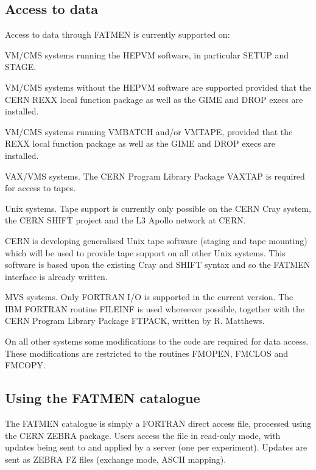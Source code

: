 \subsection{Access to data}
\par
Access to data through FATMEN is currently supported on:
\begin{OL}
\item
VM/CMS systems running the HEPVM software, in particular SETUP and STAGE.
\item
VM/CMS systems without the HEPVM software are supported
provided that the CERN REXX local function package as well as the
GIME and DROP execs are installed. 
\item 
{}
VM/CMS systems running VMBATCH and/or VMTAPE, provided that the
REXX local function package as well as the
GIME and DROP execs are installed. 
\item
{}
VAX/VMS systems. The CERN Program Library Package VAXTAP is required
for access to tapes.
\item
{}
Unix systems. Tape support is currently only possible on the CERN Cray
system, the CERN SHIFT project and the
L3 Apollo network at CERN.
\par
CERN is developing generalised Unix tape software (staging and tape
mounting) which will be used to provide tape support on all other
Unix systems. This software is based upon the existing Cray and
SHIFT syntax and so the FATMEN interface is already written.
\item
MVS systems. Only FORTRAN I/O is supported in the current version.
The IBM FORTRAN routine FILEINF is used whereever possible,
together with the CERN Program Library Package FTPACK, written
by R. Matthews.
\end{OL}
\par
On all other systems some modifications to the code are required for
data access. These modifications are restricted to the routines
FMOPEN, FMCLOS and FMCOPY.
\subsection{Using the FATMEN catalogue}
\par
The FATMEN catalogue is simply a FORTRAN direct access file, processed
using the CERN ZEBRA package. Users access the file in read-only mode,
with updates being sent to and applied by a server (one per experiment).
Updates are sent as ZEBRA FZ files (exchange mode, ASCII mapping).

